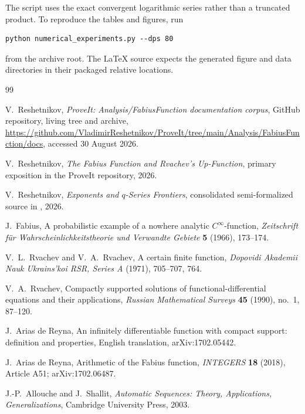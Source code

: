 \documentclass[11pt]{article}
\theoremstyle{definition}
\begin{document}
The script uses the exact convergent logarithmic series rather than a truncated product.  To reproduce the tables and figures, run
\begin{lstlisting}[style=py]
python numerical_experiments.py --dps 80
\end{lstlisting}
from the archive root.  The LaTeX source expects the generated figure and data directories in their packaged relative locations.

\begin{thebibliography}{99}

V.~Reshetnikov,
\newblock \emph{ProveIt: Analysis/FabiusFunction documentation corpus},
\newblock GitHub repository, living tree and archive,
\newblock \url{https://github.com/VladimirReshetnikov/ProveIt/tree/main/Analysis/FabiusFunction/docs},
accessed 30 August 2026.

V.~Reshetnikov,
\newblock \emph{The Fabius Function and Rvachev's Up-Function},
\newblock primary exposition in the ProveIt repository, 2026.

V.~Reshetnikov,
\newblock \emph{Exponents and $q$-Series Frontiers},
\newblock consolidated semi-formalized source in
, 2026.

J.~Fabius,
\newblock A probabilistic example of a nowhere analytic $C^\infty$-function,
\newblock \emph{Zeitschrift f\"ur Wahrscheinlichkeitstheorie und Verwandte Gebiete}
\textbf{5} (1966), 173--174.

V.~L.~Rvachev and V.~A.~Rvachev,
\newblock A certain finite function,
\newblock \emph{Dopovidi Akademii Nauk Ukrains'koi RSR, Series A} (1971), 705--707, 764.

V.~A.~Rvachev,
\newblock Compactly supported solutions of functional-differential equations and their applications,
\newblock \emph{Russian Mathematical Surveys} \textbf{45} (1990), no.~1, 87--120.

J.~Arias de Reyna,
\newblock An infinitely differentiable function with compact support: definition and properties,
\newblock English translation, arXiv:1702.05442.

J.~Arias de Reyna,
\newblock Arithmetic of the Fabius function,
\newblock \emph{INTEGERS} \textbf{18} (2018), Article A51; arXiv:1702.06487.

J.-P.~Allouche and J.~Shallit,
\newblock \emph{Automatic Sequences: Theory, Applications, Generalizations},
\newblock Cambridge University Press, 2003.


\end{thebibliography}
\end{document}
